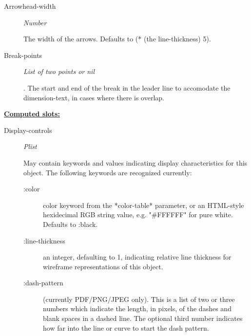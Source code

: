 \documentclass [11pt]{book}
\begin{document}
\begin{itemize}
\begin{description}
\item [Arrowhead-width]
\emph{Number}

 The width of the arrows. Defaults to (* (the line-thickness) 5).




\item [Break-points]
\emph{List of two points or nil}

.
The start and end of the break in the leader line to accomodate the dimension-text,
in cases where there is overlap.




\end{description}






\textbf{
\underline{Computed slots:}}

\begin{description}

\item [Display-controls]
\emph{Plist}

 May contain keywords and values indicating display characteristics for
this object. The following keywords are recognized currently:



\begin{description}


\item[:color]
 color keyword from the *color-table* parameter, or an HTML-style hexidecimal
RGB string value, e.g. "\#FFFFFF" for pure white. Defaults to :black.


\item[:line-thickness]
 an integer, defaulting to 1, indicating relative line thickness for wireframe
representations of this object.


\item[:dash-pattern]
(currently PDF/PNG/JPEG only). This is a list of two or three numbers which indicate the length,
in pixels, of the dashes and blank spaces in a dashed line. The optional third number
indicates how far into the line or curve to start the dash pattern.

\end{description}





\end{description}








\end{itemize}
\end{document}
